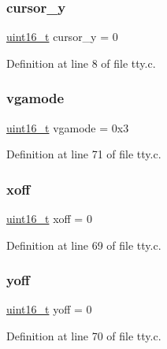 \subsubsection{\texorpdfstring{cursor\+\_\+y}{cursor\_y}}
{\footnotesize\ttfamily \hyperlink{a00134_a273cf69d639a59973b6019625df33e30_a273cf69d639a59973b6019625df33e30}{uint16\+\_\+t} cursor\+\_\+y = 0}



Definition at line 8 of file tty.\+c.

\mbox{\label{a00167_af93b0649fdd1bea5b6d29ed37205aa2c_af93b0649fdd1bea5b6d29ed37205aa2c}} 
\subsubsection{\texorpdfstring{vgamode}{vgamode}}
{\footnotesize\ttfamily \hyperlink{a00134_a273cf69d639a59973b6019625df33e30_a273cf69d639a59973b6019625df33e30}{uint16\+\_\+t} vgamode = 0x3}



Definition at line 71 of file tty.\+c.

\mbox{\label{a00167_abaa0d20f0e52ce0d3a7d706f6ac16266_abaa0d20f0e52ce0d3a7d706f6ac16266}} 
\subsubsection{\texorpdfstring{xoff}{xoff}}
{\footnotesize\ttfamily \hyperlink{a00134_a273cf69d639a59973b6019625df33e30_a273cf69d639a59973b6019625df33e30}{uint16\+\_\+t} xoff = 0}



Definition at line 69 of file tty.\+c.

\mbox{\label{a00167_a1a7539764d0ae8cd06ce45c62cf92bca_a1a7539764d0ae8cd06ce45c62cf92bca}} 
\subsubsection{\texorpdfstring{yoff}{yoff}}
{\footnotesize\ttfamily \hyperlink{a00134_a273cf69d639a59973b6019625df33e30_a273cf69d639a59973b6019625df33e30}{uint16\+\_\+t} yoff = 0}



Definition at line 70 of file tty.\+c.

